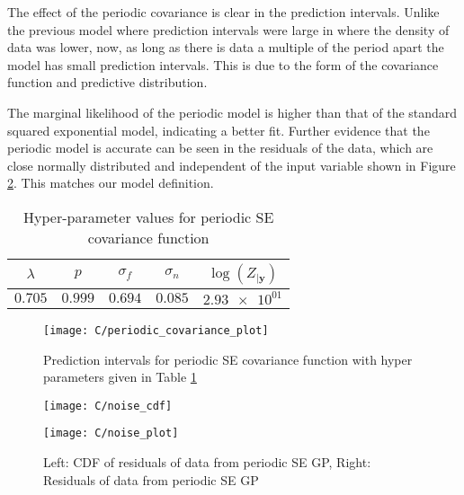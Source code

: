 \documentclass[11pt]{article}
\begin{document}
The effect of the periodic covariance is clear in the prediction intervals. Unlike the previous model where prediction intervals were large in where the density of data was lower, now, as long as there is data a multiple of the period apart the model has small prediction intervals. This is due to the form of the covariance function and predictive distribution.

The marginal likelihood of the periodic model is higher than that of the standard squared exponential model, indicating a better fit. Further evidence that the periodic model is accurate can be seen in the residuals of the data, which are close normally distributed and independent of the input variable shown in Figure \ref{fig:C_noise_distribution}. This matches our model definition.

\begin{table}[h]
    \centering
    \small
    \begin{tabular}{|c|c|c|c|c|}
        \hline
        $\lambda$ & $p$ & $\sigma_f$ & $\sigma_n$ & $\log(Z_{|\textbf{y}})$ \\
        \hline
        $0.705$ & $0.999$ & $0.694$ & $0.085$ & $\num{2.93e+01}$ \\ 
        \hline
    \end{tabular}
    \caption{Hyper-parameter values for periodic SE covariance function}
    \label{table:C_periodic_covariance_hyper_parameters}
\end{table}

\begin{figure}[h]
    \centering
    \texttt{[image: C/periodic\_covariance\_plot]}
    \caption{Prediction intervals for periodic SE covariance function with hyper parameters given in Table \ref{table:C_periodic_covariance_hyper_parameters}}
    \label{fig:B_periodic_covariance_prediction_intervals}
\end{figure}

\begin{figure}[h]
    \centering
    \begin{minipage}{0.5\textwidth}
        \centering
        \texttt{[image: C/noise\_cdf]} %
    \end{minipage}%
    \begin{minipage}{0.5\textwidth}
        \centering
        \texttt{[image: C/noise\_plot]} %
    \end{minipage}
    \caption{Left: CDF of residuals of data from periodic SE GP, Right: Residuals of data from periodic SE GP}
    \label{fig:C_noise_distribution}
\end{figure}
\end{document}
